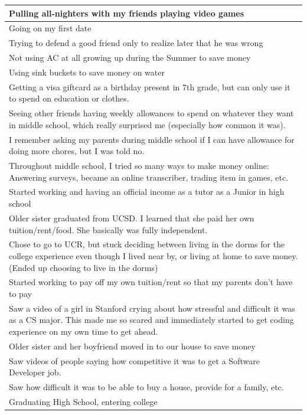 \documentclass[
  .7em,
  letterpaper,
  DIV=11,
  numbers=noendperiod]{scrartcl}
\begin{document}
\begin{table}
\begin{tabular}{l}
\hline
Pulling all-nighters with my friends playing video games\\
\hline
Going on my first date\\
\hline
Trying to defend a good friend only to realize later that he was wrong\\
\hline
Not using AC at all growing up during the Summer to save money\\
\hline
Using sink buckets to save money on water\\
\hline
Getting a visa giftcard as a birthday present in 7th grade, but can only use it to spend on education or clothes.\\
\hline
Seeing other friends having weekly allowances to spend on whatever they want in middle school, which really surprised me (especially how common it was).\\
\hline
I remember asking my parents during middle school if I can have allowance for doing more chores, but I was told no.\\
\hline
Throughout middle school, I tried so many ways to make money online: Answering surveys, became an online transcriber, trading item in games, etc.\\
\hline
Started working and having an official income as a tutor as a Junior in high school\\
\hline
Older sister graduated from UCSD. I learned that she paid her own tuition/rent/food. She basically was fully independent.\\
\hline
Chose to go to UCR, but stuck deciding between living in the dorms for the college experience even though I lived near by, or living at home to save money. (Ended up choosing to live in the dorms)\\
\hline
Started working to pay off my own tuition/rent so that my parents don't have to pay\\
\hline
Saw a video of a girl in Stanford crying about how stressful and difficult it was as a CS major. This made me so scared and immediately started to get coding experience on my own time to get ahead.\\
\hline
Older sister and her boyfriend moved in to our house to save money\\
\hline
Saw videos of people saying how competitive it was to get a Software Developer job.\\
\hline
Saw how difficult it was to be able to buy a house, provide for a family, etc.\\
\hline
Graduating High School, entering college\\

\end{tabular}
\end{table}
\end{document}
